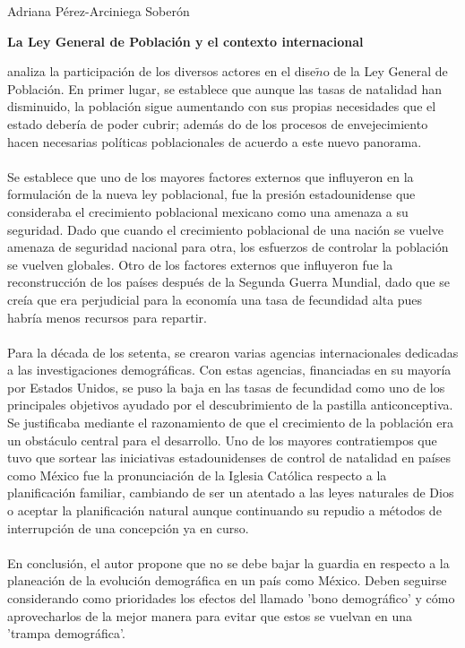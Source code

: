 \documentclass[11pt,spanish,letterpaper]{article}
\theoremstyle{plain}
\begin{document}
\begin{flushleft}
Adriana P\'erez-Arciniega Sober\'on
\end{flushleft}
\begin{center}
\textbf{La Ley General de Poblaci\'on y el contexto internacional}
\end{center}
\cite{welti2005ley} analiza la participaci\'on de los diversos actores en el dise$\tilde{n}$o de la Ley General de Poblaci\'on. En primer lugar, se establece que aunque las tasas de natalidad han disminuido, la poblaci\'on sigue aumentando con sus propias necesidades que el estado deber\'ia de poder cubrir; adem\'as do de los procesos de envejecimiento hacen necesarias pol\'iticas poblacionales de acuerdo a este nuevo panorama.\\
\\
Se establece que uno de los mayores factores externos que influyeron en la formulaci\'on de la nueva ley poblacional, fue la presi\'on estadounidense que consideraba el crecimiento poblacional mexicano como una amenaza a su seguridad. Dado que cuando el crecimiento poblacional de una naci\'on se vuelve amenaza de seguridad nacional para otra, los esfuerzos de controlar la poblaci\'on se vuelven globales. Otro de los factores externos que influyeron fue la reconstrucci\'on de los pa\'ises despu\'es de la Segunda Guerra Mundial, dado que se cre\'ia que era perjudicial para la econom\'ia una tasa de fecundidad alta pues habr\'ia menos recursos para repartir.\\
\\
Para la d\'ecada de los setenta, se crearon varias agencias internacionales dedicadas a las investigaciones demogr\'aficas. Con estas agencias, financiadas en su mayor\'ia por Estados Unidos, se puso la baja en las tasas de fecundidad como uno de los principales objetivos ayudado por el descubrimiento de la pastilla anticonceptiva. Se justificaba mediante el razonamiento de que el crecimiento de la poblaci\'on era un obst\'aculo central para el desarrollo. Uno de los mayores contratiempos que tuvo que sortear las iniciativas estadounidenses de control de natalidad en pa\'ises como M\'exico fue la pronunciaci\'on de la Iglesia Cat\'olica respecto a la planificaci\'on familiar, cambiando de ser un atentado a las leyes naturales de Dios o aceptar la planificaci\'on natural aunque continuando su repudio a m\'etodos de interrupci\'on de una concepci\'on ya en curso. \\
\\
En conclusi\'on, el autor propone que no se debe bajar la guardia en respecto a la planeaci\'on de la evoluci\'on demogr\'afica en un pa\'is como M\'exico. Deben seguirse considerando como prioridades los efectos del llamado 'bono demogr\'afico' y c\'omo aprovecharlos de la mejor manera para evitar que estos se vuelvan en una 'trampa demogr\'afica'.


\end{document}

